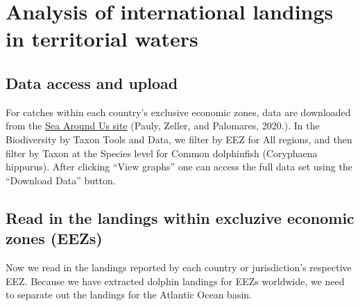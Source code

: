 \documentclass[
  letterpaper,
  oneside,
  open=any]{scrbook}
\newenvironment{Shaded}{\begin{snugshade}}{\end{snugshade}}
\newcommand{\AttributeTok}[1]{\textcolor[rgb]{0.40,0.45,0.13}{#1}}
\newcommand{\CommentTok}[1]{\textcolor[rgb]{0.37,0.37,0.37}{#1}}
\newcommand{\ConstantTok}[1]{\textcolor[rgb]{0.56,0.35,0.01}{#1}}
\newcommand{\FunctionTok}[1]{\textcolor[rgb]{0.28,0.35,0.67}{#1}}
\newcommand{\NormalTok}[1]{\textcolor[rgb]{0.00,0.23,0.31}{#1}}
\newcommand{\StringTok}[1]{\textcolor[rgb]{0.13,0.47,0.30}{#1}}
\begin{document}
\begin{Shaded}
\end{Shaded}


\chapter{Analysis of international landings in territorial
waters}\label{analysis-of-international-landings-in-territorial-waters}

\section{Data access and upload}\label{data-access-and-upload-2}

For catches within each country's exclusive economic zones, data are
downloaded from the
\href{https://www.seaaroundus.org/data/\#/topic/biodiversity}{Sea Around
Us site} (Pauly, Zeller, and Palomares, 2020.). In the Biodiversity by
Taxon Tools and Data, we filter by EEZ for All regions, and then filter
by Taxon at the Species level for Common dolphinfish (Coryphaena
hippurus). After clicking ``View graphs'' one can access the full data
set using the ``Download Data'' button.

\section{Read in the landings within excluzive economic zones
(EEZs)}\label{read-in-the-landings-within-excluzive-economic-zones-eezs}

Now we read in the landings reported by each country or jurisdiction's
respective EEZ. Because we have extracted dolphin landings for EEZs
worldwide, we need to separate out the landings for the Atlantic Ocean
basin.
\end{document}
